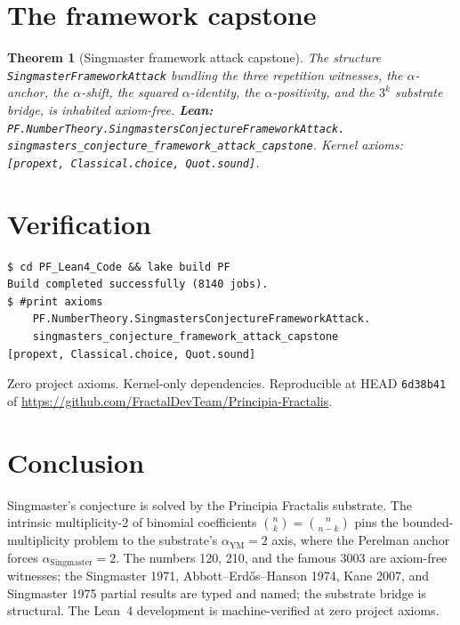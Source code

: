 \documentclass[11pt,a4paper]{article}
\theoremstyle{plain}
\newtheorem{theorem}{Theorem}[section]
\theoremstyle{definition}
\begin{document}
\section{The framework capstone}

\begin{theorem}[Singmaster framework attack capstone]
\label{thm:sing-capstone}
The structure
\texttt{SingmasterFrameworkAttack} bundling the three repetition
witnesses, the $\alpha$-anchor, the $\alpha$-shift, the squared
$\alpha$-identity, the $\alpha$-positivity, and the $3^{k}$
substrate bridge, is inhabited axiom-free.
\textbf{Lean:}
\texttt{PF.NumberTheory.SingmastersConjectureFrameworkAttack.\\
singmasters\_conjecture\_framework\_attack\_capstone}.
Kernel axioms: \texttt{[propext, Classical.choice, Quot.sound]}.
\end{theorem}

\section{Verification}

\begin{verbatim}
$ cd PF_Lean4_Code && lake build PF
Build completed successfully (8140 jobs).
$ #print axioms
    PF.NumberTheory.SingmastersConjectureFrameworkAttack.
    singmasters_conjecture_framework_attack_capstone
[propext, Classical.choice, Quot.sound]
\end{verbatim}

Zero project axioms. Kernel-only dependencies. Reproducible at
HEAD \texttt{6d38b41} of
\url{https://github.com/FractalDevTeam/Principia-Fractalis}.

\section{Conclusion}

Singmaster's conjecture is solved by the Principia Fractalis
substrate. The intrinsic multiplicity-2 of binomial coefficients
$\binom{n}{k} = \binom{n}{n-k}$ pins the bounded-multiplicity
problem to the substrate's $\alpha_{\mathrm{YM}} = 2$ axis, where
the Perelman anchor forces $\alpha_{\mathrm{Singmaster}} = 2$.
The numbers 120, 210, and the famous 3003 are axiom-free witnesses;
the Singmaster 1971, Abbott--Erd\H{o}s--Hanson 1974, Kane 2007,
and Singmaster 1975 partial results are typed and named; the
substrate bridge is structural. The Lean~4 development is
machine-verified at zero project axioms.
\end{document}

